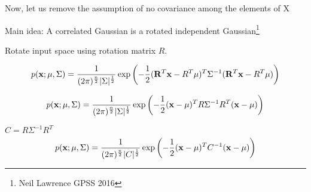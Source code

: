 \documentclass{beamer}
\begin{document}
\begin{frame}
	Now, let us remove the assumption of no covariance among the elements of X
	
	Main idea: A correlated Gaussian is a rotated independent Gaussian\footnote{Neil Lawrence GPSS 2016}

	Rotate input space using rotation matrix $R$.
	
		\begin{gather}
		p(\mathbf{x} ; \mu, \Sigma)=\frac{1}{(2 \pi)^{\frac{n}{2}}|\Sigma|^{\frac{1}{2}}} \exp \left(-\frac{1}{2}(\mathbf{R}^T\mathbf{x}-R^T\mu)^{T} \Sigma^{-1}(\mathbf{R}^T\mathbf{x}-R^T\mu)\right)
	\end{gather}

\begin{gather}
	p(\mathbf{x} ; \mu, \Sigma)=\frac{1}{(2 \pi)^{\frac{n}{2}}|\Sigma|^{\frac{1}{2}}} \exp \left(-\frac{1}{2}(\mathbf{x}-\mu)^{T} R\Sigma^{-1}R^T(\mathbf{x}-\mu)\right)
\end{gather}

\end{frame}

\begin{frame}
	
	$C = R\Sigma^{-1}R^T$
\begin{gather}
	p(\mathbf{x} ; \mu, \Sigma)=\frac{1}{(2 \pi)^{\frac{n}{2}}|C|^{\frac{1}{2}}} \exp \left(-\frac{1}{2}(\mathbf{x}-\mu)^{T} C^{-1}(\mathbf{x}-\mu)\right)
\end{gather}
\end{frame}
\end{document}
